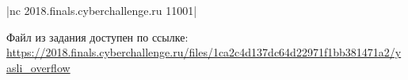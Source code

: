
|nc 2018.finals.cyberchallenge.ru 11001|

Файл из задания доступен по ссылке: \url{https://2018.finals.cyberchallenge.ru/files/1ca2c4d137dc64d22971f1bb381471a2/yasli_overflow}

\solutionSection


